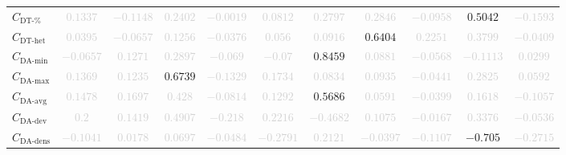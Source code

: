 \documentclass{standalone}
\newcommand{\percentageuniquetracesname}{\text{DT-\%}}
\newcommand{\percentageuniquetraces}{C_{\percentageuniquetracesname}}
\newcommand{\dthetname}{\text{DT-het}}
\newcommand{\dthet}{C_{\dthetname}}
\newcommand{\daminname}{\text{DA-min}}
\newcommand{\damin}{C_{\daminname}}
\newcommand{\daavgname}{\text{DA-avg}}
\newcommand{\daavg}{C_{\daavgname}}
\newcommand{\damaxname}{\text{DA-max}}
\newcommand{\damax}{C_{\damaxname}}
\newcommand{\dadevname}{\text{DA-dev}}
\newcommand{\dadev}{C_{\dadevname}}
\newcommand{\dadensname}{\text{DA-dens}}
\newcommand{\dadens}{C_{\dadensname}}
\begin{document}
\begin{tabular}{lcccccccccc}
$\percentageuniquetraces$ & \textcolor{lightgray}{$0.1337$} & \textcolor{lightgray}{$-0.1148$} & \textcolor{lightgray}{$0.2402$} & \textcolor{lightgray}{$-0.0019$} & \textcolor{lightgray}{$0.0812$} & \textcolor{lightgray}{$0.2797$} & \textcolor{lightgray}{$0.2846$} & \textcolor{lightgray}{$-0.0958$} & $0.5042$ & \textcolor{lightgray}{$-0.1593$} \\ 
$\dthet$ & \textcolor{lightgray}{$0.0395$} & \textcolor{lightgray}{$-0.0657$} & \textcolor{lightgray}{$0.1256$} & \textcolor{lightgray}{$-0.0376$} & \textcolor{lightgray}{$0.056$} & \textcolor{lightgray}{$0.0916$} & $0.6404$ & \textcolor{lightgray}{$0.2251$} & \textcolor{lightgray}{$0.3799$} & \textcolor{lightgray}{$-0.0409$} \\ 
$\damin$ & \textcolor{lightgray}{$-0.0657$} & \textcolor{lightgray}{$0.1271$} & \textcolor{lightgray}{$0.2897$} & \textcolor{lightgray}{$-0.069$} & \textcolor{lightgray}{$-0.07$} & $0.8459$ & \textcolor{lightgray}{$0.0881$} & \textcolor{lightgray}{$-0.0568$} & \textcolor{lightgray}{$-0.1113$} & \textcolor{lightgray}{$0.0299$} \\ 
$\damax$ & \textcolor{lightgray}{$0.1369$} & \textcolor{lightgray}{$0.1235$} & $0.6739$ & \textcolor{lightgray}{$-0.1329$} & \textcolor{lightgray}{$0.1734$} & \textcolor{lightgray}{$0.0834$} & \textcolor{lightgray}{$0.0935$} & \textcolor{lightgray}{$-0.0441$} & \textcolor{lightgray}{$0.2825$} & \textcolor{lightgray}{$0.0592$} \\ 
$\daavg$ & \textcolor{lightgray}{$0.1478$} & \textcolor{lightgray}{$0.1697$} & \textcolor{lightgray}{$0.428$} & \textcolor{lightgray}{$-0.0814$} & \textcolor{lightgray}{$0.1292$} & $0.5686$ & \textcolor{lightgray}{$0.0591$} & \textcolor{lightgray}{$-0.0399$} & \textcolor{lightgray}{$0.1618$} & \textcolor{lightgray}{$-0.1057$} \\ 
$\dadev$ & \textcolor{lightgray}{$0.2$} & \textcolor{lightgray}{$0.1419$} & \textcolor{lightgray}{$0.4907$} & \textcolor{lightgray}{$-0.218$} & \textcolor{lightgray}{$0.2216$} & \textcolor{lightgray}{$-0.4682$} & \textcolor{lightgray}{$0.1075$} & \textcolor{lightgray}{$-0.0167$} & \textcolor{lightgray}{$0.3376$} & \textcolor{lightgray}{$-0.0536$} \\ 
$\dadens$ & \textcolor{lightgray}{$-0.1041$} & \textcolor{lightgray}{$0.0178$} & \textcolor{lightgray}{$0.0697$} & \textcolor{lightgray}{$-0.0484$} & \textcolor{lightgray}{$-0.2791$} & \textcolor{lightgray}{$0.2121$} & \textcolor{lightgray}{$-0.0397$} & \textcolor{lightgray}{$-0.1107$} & $-0.705$ & \textcolor{lightgray}{$-0.2715$} \\ 

\end{tabular}
\end{document}
